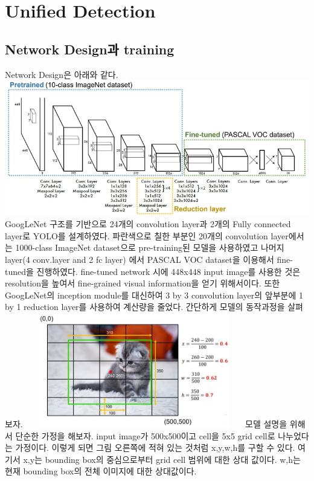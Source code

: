 \documentclass[extendedabs]{bmvc2k}
\begin{document}
\section{Unified Detection}
\subsection{Network Design과 training}
\quad Network Design은 아래와 같다.\cite{youtube}
\newline  \includegraphics[width=\linewidth]{images/01_YOLO.PNG}
GoogLeNet 구조를 기반으로 24개의 convolution layer과 2개의 Fully connected layer로 YOLO를 설계하였다. 파란색으로 칠한 부분인
20개의 convolution layer에서는 1000-class ImageNet dataset으로 pre-training된 모델을 사용하였고 나머지 layer(4 conv.layer and 2 fc layer)
에서 PASCAL VOC dataset을 이용해서 fine-tuned을 진행하였다. fine-tuned network 시에 448x448 input image를 사용한 것은 resolution을 높여서
fine-grained visual information을 얻기 위해서이다. 또한 GoogLeNet의 inception module를 대신하여 3 by 3 convolution layer의 앞부분에 
1 by 1 reduction layer를 사용하여 계산량을 줄었다. 간단하게 모델의 동작과정을 살펴보자. 
\newline  \includegraphics[width=9.5cm, height =5cm]{images/02_YOLO.PNG}
\newline 모델 설명을 위해서 단순한 가정을 해보자. input image가 500x500이고 cell을 5x5 grid cell로 나누었다는 가정이다. 이렇게 되면 그림 오른쪽에 적혀 있는 것처럼
x,y,w,h를 구할 수 있다. 여기서 x,y는 bounding box의 중심으로부터 grid cell 범위에 대한 상대 값이다. w,h는 현재 bounding box의 전체 이미지에 대한 상대값이다. 
\end{document}
